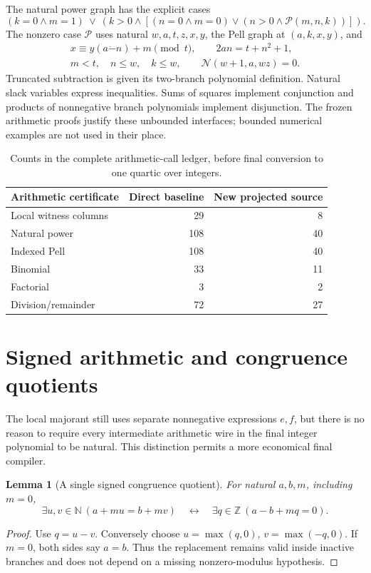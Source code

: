 \documentclass[11pt,a4paper]{article}
\newtheorem{lemma}[theorem]{Lemma}
\theoremstyle{definition}\newtheorem{definition}[theorem]{Definition}
\theoremstyle{remark}\newtheorem{remark}[theorem]{Remark}
\newcommand{\N}{\mathbb N}\newcommand{\Z}{\mathbb Z}\newcommand{\Q}{\mathbb Q}
\numberwithin{equation}{section}
\begin{document}
The natural power graph has the explicit cases
\[
 (k=0\land m=1)\ \lor\
 (k>0\land[(n=0\land m=0)\lor(n>0\land\mathcal P(m,n,k))]).
\]
The nonzero case \(\mathcal P\) uses natural \(w,a,t,z,x,y\), the
Pell graph at \((a,k,x,y)\), and
\begin{gather}
 x\equiv y(a\mathbin{\dot-}n)+m\pmod t,
 \qquad 2an=t+n^2+1,\nonumber\\
 m<t,\quad n\le w,\quad k\le w,
 \qquad\mathcal N(w+1,a,wz)=0.
\label{eq:power}
\end{gather}
Truncated subtraction is given its two-branch polynomial definition.
Natural slack variables express inequalities. Sums of squares implement
conjunction and products of nonnegative branch polynomials implement
disjunction. The frozen arithmetic proofs justify these unbounded
interfaces; bounded numerical examples are not used in their place.

\begin{table}[ht]\centering
\begin{tabular}{lrr}\toprule
Arithmetic certificate & Direct baseline & New projected source\\\midrule
Local witness columns &29&8\\
Natural power &108&40\\
Indexed Pell &108&40\\
Binomial &33&11\\
Factorial &3&2\\
Division/remainder &72&27\\\bottomrule
\end{tabular}
\caption{Counts in the complete arithmetic-call ledger, before final
conversion to one quartic over integers.}
\label{tab:calls}\end{table}

\section{Signed arithmetic and congruence quotients}
\label{sec:signed}

The local majorant still uses separate nonnegative expressions \(e,f\),
but there is no reason to require every intermediate arithmetic wire in
the final integer polynomial to be natural. This distinction permits a
more economical final compiler.

\begin{lemma}[A single signed congruence quotient]\label{lem:quotient}
For natural \(a,b,m\), including \(m=0\),
\[
 \exists u,v\in\N\ (a+mu=b+mv)
 \quad\longleftrightarrow\quad
 \exists q\in\Z\ (a-b+mq=0).
\]
\end{lemma}
\begin{proof}
Use \(q=u-v\). Conversely choose
\(u=\max(q,0)\), \(v=\max(-q,0)\). If \(m=0\), both sides say
\(a=b\). Thus the replacement remains valid inside inactive branches
and does not depend on a missing nonzero-modulus hypothesis.
\end{proof}
\end{document}
